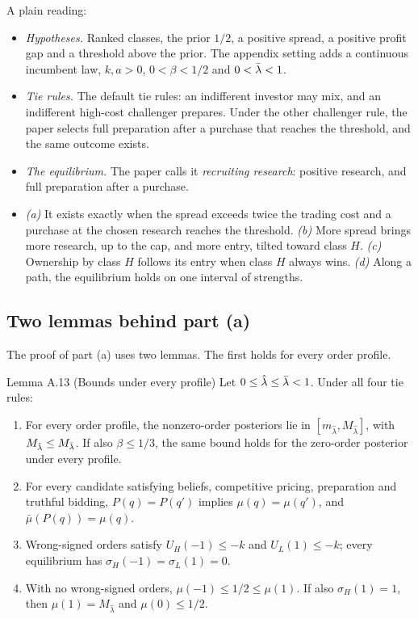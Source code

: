 A plain reading:
\begin{itemize}
\item \emph{Hypotheses.} Ranked classes, the prior \(1/2\), a positive spread, a positive profit gap and a threshold
above the prior. The appendix setting adds a continuous incumbent law, \(k,a>0\), \(0<\beta<1/2\) and \(0<\bar\lambda<1\).
\item \emph{Tie rules.} The default tie rules: an indifferent investor may mix, and an indifferent high-cost challenger
prepares. Under the other challenger rule, the paper selects full preparation after a purchase that reaches the
threshold, and the same outcome exists.
\item \emph{The equilibrium.} The paper calls it \emph{recruiting research}: positive research, and full preparation
after a purchase.
\item \emph{(a)} It exists exactly when the spread exceeds twice the trading cost and a purchase at the chosen research
reaches the threshold. \emph{(b)} More spread brings more research, up to the cap, and more entry, tilted toward
class \(H\). \emph{(c)} Ownership by class \(H\) follows its entry when class \(H\) always wins. \emph{(d)} Along a
path, the equilibrium holds on one interval of strengths.
\end{itemize}

\subsection{Two lemmas behind part (a)}

The proof of part (a) uses two lemmas. The first holds for every order profile.

\begin{paperresult}{Lemma A.13 (Bounds under every profile)}
Let \(0\le\hat\lambda\le\bar\lambda<1\). Under all four tie rules:
\begin{enumerate}[label=(\alph*),leftmargin=2em]
\item For every order profile, the nonzero-order posteriors lie in \([m_{\hat\lambda},M_{\hat\lambda}]\), with
\(M_{\hat\lambda}\le M_{\bar\lambda}\). If also \(\beta\le1/3\), the same bound holds for the zero-order posterior under every
profile.
\item For every candidate satisfying beliefs, competitive pricing, preparation and truthful bidding, \(P(q)=P(q')\)
implies \(\mu(q)=\mu(q')\), and \(\bar\mu(P(q))=\mu(q)\).
\item Wrong-signed orders satisfy \(U_H(-1)\le-k\) and \(U_L(1)\le-k\); every equilibrium has
\(\sigma_H(-1)=\sigma_L(1)=0\).
\item With no wrong-signed orders, \(\mu(-1)\le1/2\le\mu(1)\). If also \(\sigma_H(1)=1\), then
\(\mu(1)=M_{\hat\lambda}\) and \(\mu(0)\le1/2\).
\end{enumerate}
\end{paperresult}

